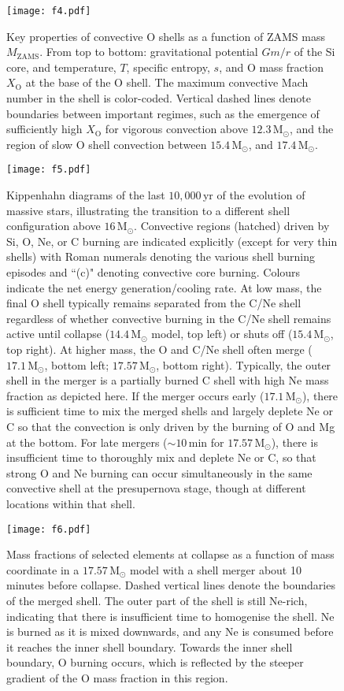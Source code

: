 \documentclass[useAMS,usenatbib]{mnras}
\newcommand{\Msun}{\ensuremath{\mathrm{M}_\odot}}
\begin{document}
\begin{figure}
\texttt{[image: f4.pdf]}
\caption{Key properties of convective O shells as a function of ZAMS mass $M_\mathrm{ZAMS}$.  From top to bottom: gravitational potential $Gm/r$ of the Si core, and temperature, $T$, specific entropy, $s$, and O mass fraction $X_\mathrm{O}$ at the base of the O shell.  The maximum convective Mach number in the shell is color-coded. Vertical dashed lines denote boundaries between important regimes, such as the emergence of sufficiently high $X_\mathrm{O}$ for vigorous convection above $12.3\,\Msun$, and the region of slow O shell convection between $15.4\,\Msun$, and $17.4\,\Msun$. 
\label{fig:shells}}
\end{figure}


\begin{figure*}
\texttt{[image: f5.pdf]}
\caption{Kippenhahn diagrams of the last $10,000\,$yr of the evolution
  of massive stars, illustrating the transition to a different shell
  configuration above $\mathord{16} \,\Msun$. Convective regions
  (hatched) driven by Si, O, Ne, or C burning are indicated explicitly
  (except for very thin shells) with Roman numerals denoting the
  various shell burning episodes and ``(c)" denoting convective core
  burning.  Colours indicate the net energy generation/cooling rate.
  At low mass, the final O shell typically remains separated from the
  C/Ne shell regardless of whether convective burning in the C/Ne
  shell remains active until collapse ($14.4 \,\Msun$ model, top left)
  or shuts off ($15.4 \,\Msun$, top right).  At higher mass, the O and
  C/Ne shell often merge ($17.1 \,\Msun$, bottom left; $17.57
  \,\Msun$, bottom right). Typically, the outer shell in the merger
    is a partially burned C shell with high Ne mass fraction as
    depicted here. If the merger occurs early ($17.1 \,\Msun$), there
  is sufficient time to mix the merged shells and largely deplete Ne
  or C so that the convection is only driven by the burning of O and
  Mg at the bottom.  For late mergers ($\mathord{\sim} 10
  \,\mathrm{min}$ for $17.57 \,\Msun$), there is insufficient time to
  thoroughly mix and deplete Ne or C, so that strong O and Ne burning
  can occur simultaneously in the same convective shell at the
  presupernova stage, though at different locations within that shell.
\label{fig:kippenhahn2}}
\end{figure*}


\begin{figure}
\texttt{[image: f6.pdf]}
\caption{Mass fractions of selected elements at collapse as a function
  of mass coordinate in a $17.57\,\Msun$ model with a shell merger
  about 10 minutes before collapse.  Dashed vertical lines denote
    the boundaries of the merged shell.  The outer part of the shell
    is still Ne-rich, indicating that there is insufficient time to
    homogenise the shell.  Ne is burned as it is mixed downwards, and
    any Ne is consumed before it reaches the inner shell boundary.
    Towards the inner shell boundary, O burning occurs, which is
    reflected by the steeper gradient of the O mass fraction in this
    region.
\label{fig:Xm}}
\end{figure}
\end{document}

